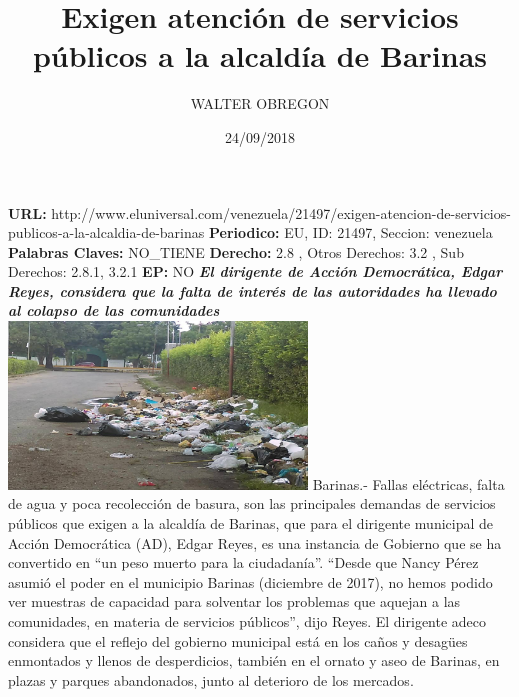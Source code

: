 \documentclass{article}%
\title{\textbf{Exigen atención de servicios públicos a la alcaldía de Barinas}}%
\author{WALTER OBREGON}%
\date{24/09/2018}%
\begin{document}
%
\normalsize%
\maketitle%
\textbf{URL: }%
http://www.eluniversal.com/venezuela/21497/exigen{-}atencion{-}de{-}servicios{-}publicos{-}a{-}la{-}alcaldia{-}de{-}barinas\newline%
%
\textbf{Periodico: }%
EU, %
ID: %
21497, %
Seccion: %
venezuela\newline%
%
\textbf{Palabras Claves: }%
NO\_TIENE\newline%
%
\textbf{Derecho: }%
2.8%
, Otros Derechos: %
3.2%
, Sub Derechos: %
2.8.1, 3.2.1%
\newline%
%
\textbf{EP: }%
NO\newline%
\newline%
%
\textbf{\textit{El dirigente de Acción Democrática,  Edgar Reyes, considera que la falta de interés de las autoridades ha llevado al colapso de las comunidades}}%
\newline%
\newline%
%
\includegraphics[width=300px]{196.jpg}%
\newline%
%
Barinas.{-} Fallas eléctricas, falta de agua y poca recolección de basura, son las principales demandas de servicios públicos que exigen a la alcaldía de Barinas, que para el dirigente municipal de Acción Democrática (AD), Edgar Reyes, es una instancia de Gobierno que se ha convertido en “un peso muerto para la ciudadanía”.%
\newline%
%
“Desde que Nancy Pérez asumió el poder en el municipio Barinas (diciembre de 2017), no hemos podido ver muestras de capacidad para solventar los problemas que aquejan a las comunidades, en materia de servicios públicos”, dijo Reyes.%
\newline%
%
El dirigente adeco considera que el reflejo del gobierno municipal está en los caños y desagües enmontados y llenos de desperdicios, también en el ornato y aseo de Barinas, en plazas y parques abandonados, junto al deterioro de los mercados.%
\newline%
\end{document}
